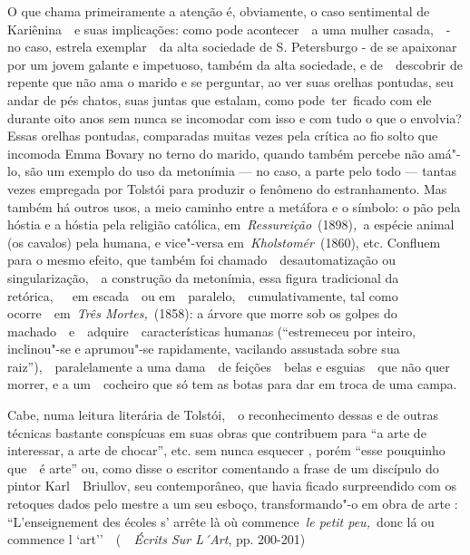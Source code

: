 O que chama primeiramente a atenção é, obviamente, o caso sentimental de
Kariênina~~e suas implicações: como pode acontecer~~a uma mulher
casada,~~- no caso, estrela exemplar~~da alta sociedade de S.
Petersburgo - de se apaixonar por um jovem galante e impetuoso, também
da alta sociedade, e de~~descobrir de repente que não ama o marido e se
perguntar, ao ver suas orelhas pontudas, seu andar de pés chatos, suas
juntas que estalam, como pode~ter~ficado com ele durante oito anos sem
nunca se incomodar com isso e com tudo o que o envolvia? Essas orelhas
pontudas, comparadas muitas vezes pela crítica ao fio solto que incomoda
Emma Bovary no terno do marido, quando também percebe não amá"-lo, são um
exemplo do uso da metonímia --- no caso, a parte pelo todo --- tantas
vezes empregada por Tolstói para produzir o fenômeno do estranhamento.
Mas também há outros usos, a meio caminho entre a metáfora e o símbolo:
o pão pela hóstia e a hóstia pela religião católica,
em~\emph{Ressureição}~(1898)\emph{,~}a espécie animal (os cavalos) pela
humana, e vice"-versa em~\emph{Kholstomér}~(1860), etc. Confluem para o
mesmo efeito, que também foi chamado~~desautomatização ou
singularização,~~a construção da metonímia, essa figura tradicional da
retórica,~~~em escada~~ou em~~paralelo,~~cumulativamente, tal como
ocorre~~em~\emph{Três Mortes,}~(1858): a árvore que morre sob os golpes
do machado~~e~~adquire~~características humanas (``estremeceu por
inteiro, inclinou"-se e aprumou"-se rapidamente, vacilando assustada sobre
sua raiz''),~~paralelamente a uma dama~~de feições~~belas e esguias~~que
não quer morrer, e a um~~cocheiro que só tem as botas para dar em troca
de uma campa.

Cabe, numa leitura literária de Tolstói,~~o reconhecimento dessas e de
outras técnicas bastante conspícuas em suas obras que contribuem para
``a arte de interessar, a arte de chocar'', etc. sem nunca esquecer ,
porém ``esse pouquinho que~~é arte'' ou, como disse o escritor
comentando a frase de um discípulo do pintor Karl~~Briullov, seu
contemporâneo, que havia ficado surpreendido com os retoques dados pelo
mestre a um seu esboço, transformando"-o em obra de arte :
``L'enseignement des écoles s' arrête là où commence~\emph{le petit
peu,~}donc lá ou commence l `art''~~(~\emph{~Écrits Sur L´Art}, pp.
200-201)

~

